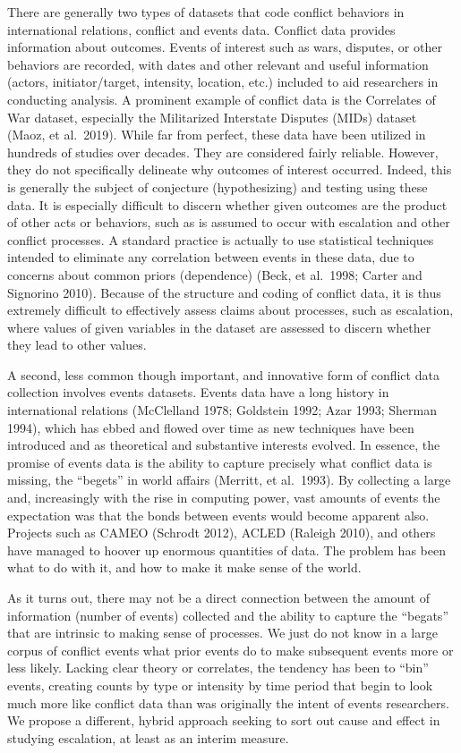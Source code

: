 \documentclass[
  letterpaper,
  DIV=11,
  numbers=noendperiod]{scrartcl}
\begin{document}
There are generally two types of datasets that code conflict behaviors
in international relations, conflict and events data. Conflict data
provides information about outcomes. Events of interest such as wars,
disputes, or other behaviors are recorded, with dates and other relevant
and useful information (actors, initiator/target, intensity, location,
etc.) included to aid researchers in conducting analysis. A prominent
example of conflict data is the Correlates of War dataset, especially
the Militarized Interstate Disputes (MIDs) dataset (Maoz, et al.~2019).
While far from perfect, these data have been utilized in hundreds of
studies over decades. They are considered fairly reliable. However, they
do not specifically delineate why outcomes of interest occurred. Indeed,
this is generally the subject of conjecture (hypothesizing) and testing
using these data. It is especially difficult to discern whether given
outcomes are the product of other acts or behaviors, such as is assumed
to occur with escalation and other conflict processes. A standard
practice is actually to use statistical techniques intended to eliminate
any correlation between events in these data, due to concerns about
common priors (dependence) (Beck, et al.~1998; Carter and Signorino
2010). Because of the structure and coding of conflict data, it is thus
extremely difficult to effectively assess claims about processes, such
as escalation, where values of given variables in the dataset are
assessed to discern whether they lead to other values.

A second, less common though important, and innovative form of conflict
data collection involves events datasets. Events data have a long
history in international relations (McClelland 1978; Goldstein 1992;
Azar 1993; Sherman 1994), which has ebbed and flowed over time as new
techniques have been introduced and as theoretical and substantive
interests evolved. In essence, the promise of events data is the ability
to capture precisely what conflict data is missing, the ``begets'' in
world affairs (Merritt, et al.~1993). By collecting a large and,
increasingly with the rise in computing power, vast amounts of events
the expectation was that the bonds between events would become apparent
also. Projects such as CAMEO (Schrodt 2012), ACLED (Raleigh 2010), and
others have managed to hoover up enormous quantities of data. The
problem has been what to do with it, and how to make it make sense of
the world.

As it turns out, there may not be a direct connection between the amount
of information (number of events) collected and the ability to capture
the ``begats'' that are intrinsic to making sense of processes. We just
do not know in a large corpus of conflict events what prior events do to
make subsequent events more or less likely. Lacking clear theory or
correlates, the tendency has been to ``bin'' events, creating counts by
type or intensity by time period that begin to look much more like
conflict data than was originally the intent of events researchers. We
propose a different, hybrid approach seeking to sort out cause and
effect in studying escalation, at least as an interim measure.
\end{document}
